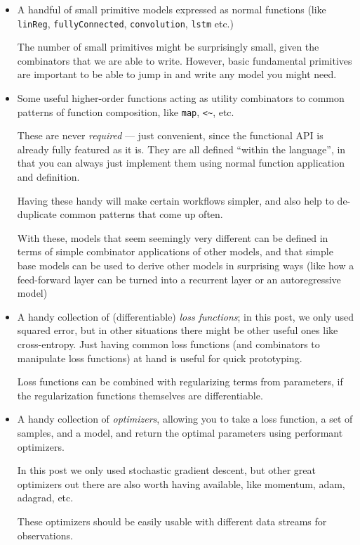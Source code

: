 \documentclass[]{article}
\begin{document}
\begin{itemize}
\item
  A handful of small primitive models expressed as normal functions (like
  \texttt{linReg}, \texttt{fullyConnected}, \texttt{convolution}, \texttt{lstm}
  etc.)

  The number of small primitives might be surprisingly small, given the
  combinators that we are able to write. However, basic fundamental primitives
  are important to be able to jump in and write any model you might need.
\item
  Some useful higher-order functions acting as utility combinators to common
  patterns of function composition, like \texttt{map},
  \texttt{\textless{}\textasciitilde{}}, etc.

  These are never \emph{required} --- just convenient, since the functional API
  is already fully featured as it is. They are all defined ``within the
  language'', in that you can always just implement them using normal function
  application and definition.

  Having these handy will make certain workflows simpler, and also help to
  de-duplicate common patterns that come up often.

  With these, models that seem seemingly very different can be defined in terms
  of simple combinator applications of other models, and that simple base models
  can be used to derive other models in surprising ways (like how a feed-forward
  layer can be turned into a recurrent layer or an autoregressive model)
\item
  A handy collection of (differentiable) \emph{loss functions}; in this post, we
  only used squared error, but in other situations there might be other useful
  ones like cross-entropy. Just having common loss functions (and combinators to
  manipulate loss functions) at hand is useful for quick prototyping.

  Loss functions can be combined with regularizing terms from parameters, if the
  regularization functions themselves are differentiable.
\item
  A handy collection of \emph{optimizers}, allowing you to take a loss function,
  a set of samples, and a model, and return the optimal parameters using
  performant optimizers.

  In this post we only used stochastic gradient descent, but other great
  optimizers out there are also worth having available, like momentum, adam,
  adagrad, etc.

  These optimizers should be easily usable with different data streams for
  observations.
\end{itemize}
\end{document}
